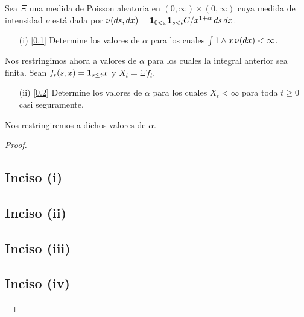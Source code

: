 \begin{problema}
    Sea $\Xi$ una medida de Poisson aleatoria en $(0,\infty)\times (0,\infty)$ cuya 
    medida de intensidad $\nu$ est\'a dada por $\nu\!\left( ds,dx\right) ={\bf{1}}_{0<x} {\bf{1}}_{s<t}C/x^{1+\alpha}\, ds\,dx$. 
    
    \begin{enumerate}
        \item[(i)]		[\ref{problema5_2:inciso1}] 
			Determine los valores de $\alpha$ para los cuales $\int 1 \wedge x\,\nu\!\left( dx\right) <\infty$. 
    \end{enumerate}
    
    Nos restringimos ahora a valores de $\alpha$ para los cuales la integral anterior sea finita. 
	Sean $f_t\!\left( s,x\right) ={\bf{1}}_{s\leq t}x$ y $X_t=\Xi f_t$. 
    
    \begin{enumerate}[resume]
        \item[(ii)]		[\ref{problema5_2:inciso2}] 
			Determine los valores  de $\alpha$ para los cuales $X_t < \infty$ para toda $t \geq 0$ casi seguramente.
    \end{enumerate}

    Nos restringiremos a dichos valores de $\alpha$. 
    
\end{problema}

\begin{proof}
	\subsection{Inciso (i)}	\label{problema5_2:inciso1}
	
	\newpage
	
	\subsection{Inciso (ii)}	\label{problema5_2:inciso2}
	
	\newpage
	
	\subsection{Inciso (iii)}	\label{problema5_2:inciso3}
	
	\newpage
	
	\subsection{Inciso (iv)}	\label{problema5_2:inciso4}
	
\end{proof}